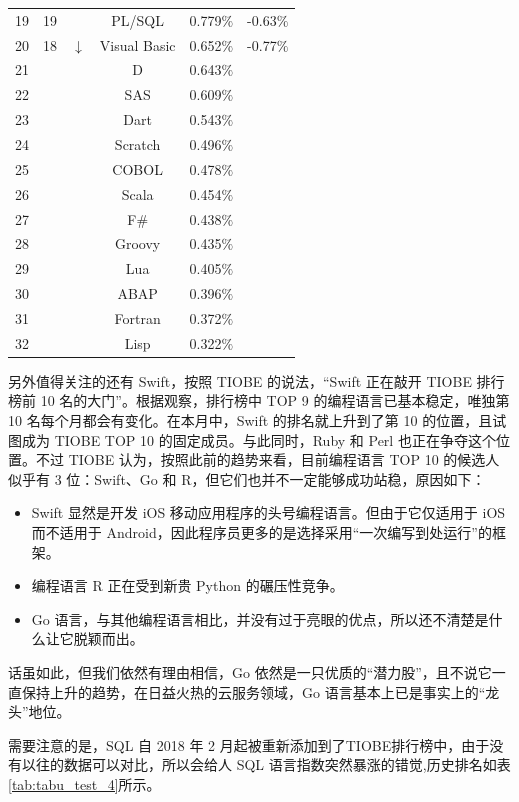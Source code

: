 \begin{longtabu}{cccccc}
	19	&	19	&		&	PL/SQL	&	0.779$\%$	&	-0.63$\%$	\\
	20	&	18	&	$\downarrow$	&	Visual Basic	&	0.652$\%$	&	-0.77$\%$	\\
	21	&		&		&	D	&	0.643$\%$	&		\\
	22	&		&		&	SAS	&	0.609$\%$	&		\\
	23	&		&		&	Dart	&	0.543$\%$	&		\\
	24	&		&		&	Scratch	&	0.496$\%$	&		\\
	25	&		&		&	COBOL	&	0.478$\%$	&		\\
	26	&		&		&	Scala	&	0.454$\%$	&		\\
	27	&		&		&	F$\#$	&	0.438$\%$	&		\\
	28	&		&		&	Groovy	&	0.435$\%$	&		\\
	29	&		&		&	Lua	&	0.405$\%$	&		\\
	30	&		&		&	ABAP	&	0.396$\%$	&		\\
	31	&		&		&	Fortran	&	0.372$\%$	&		\\
	32	&		&		&	Lisp	&	0.322$\%$	&		\\
\end{longtabu}

另外值得关注的还有 Swift，按照 TIOBE 的说法，“Swift 正在敲开 TIOBE 排行榜前 10 名的大门”。根据观察，排行榜中 TOP 9 的编程语言已基本稳定，唯独第 10 名每个月都会有变化。在本月中，Swift 的排名就上升到了第 10 的位置，且试图成为 TIOBE TOP 10 的固定成员。与此同时，Ruby 和 Perl 也正在争夺这个位置。不过 TIOBE 认为，按照此前的趋势来看，目前编程语言 TOP 10 的候选人似乎有 3 位：Swift、Go 和 R，但它们也并不一定能够成功站稳，原因如下：

\begin{itemize}
	\item Swift 显然是开发 iOS 移动应用程序的头号编程语言。但由于它仅适用于 iOS 而不适用于 Android，因此程序员更多的是选择采用“一次编写到处运行”的框架。
	\item 编程语言 R 正在受到新贵 Python 的碾压性竞争。
	\item Go 语言，与其他编程语言相比，并没有过于亮眼的优点，所以还不清楚是什么让它脱颖而出。
\end{itemize}

话虽如此，但我们依然有理由相信，Go 依然是一只优质的“潜力股”，且不说它一直保持上升的趋势，在日益火热的云服务领域，Go 语言基本上已是事实上的“龙头”地位。

需要注意的是，SQL 自 2018 年 2 月起被重新添加到了TIOBE排行榜中，由于没有以往的数据可以对比，所以会给人 SQL 语言指数突然暴涨的错觉,历史排名如表\ref{tab:tabu_test_4}所示。


